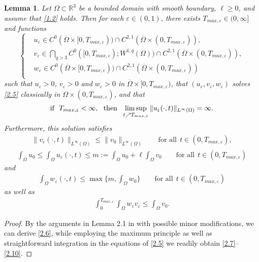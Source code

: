 \documentclass[12pt]{article}
\theoremstyle{plain}
\newtheorem{lemma}{Lemma}[section]
\theoremstyle{definition}
\numberwithin{equation}{section}
\begin{document}
\begin{lemma}\label{lemma2.1}
Let $\Omega \subset \mathbb R^3$ be a bounded domain with smooth boundary, $\ell\geq 0$, and assume that \eqref{1.2} holds.  Then for each $\varepsilon\in(0,1)$, there exists
$T_{max,\varepsilon}\in(0,\infty]$ and functions
\begin{equation*}
\left\{
\begin{aligned}
&u_{\varepsilon }\in C^0(\overline{\Omega}\times [0,T_{max,\varepsilon}))\cap C^{2,1}(\overline{\Omega}\times(0,T_{max,\varepsilon})), \\
&v_{\varepsilon }\in  \textstyle\bigcap_{q>3} C^0([0,T_{max,\varepsilon});W^{1,q}(\Omega))\cap C^{2,1}(\overline{\Omega}\times(0,T_{max,\varepsilon})),\\
&w_{\varepsilon }\in  C^0(\overline{\Omega}\times[0,T_{max,\varepsilon}))\cap C^{2,1}(\overline{\Omega}\times(0,T_{max,\varepsilon})) \\
\end{aligned}
\right.
\end{equation*}
such that $u_ \varepsilon >0$, $v_ \varepsilon >0$ and $w_{\varepsilon}>0$ in $\overline{\Omega} \times [0,T_{max,\varepsilon})$, that $(u_{\varepsilon
},v_{\varepsilon },w_{\varepsilon })$ solves \eqref{2.5} classically in $\Omega\times(0,T_{max,\varepsilon})$, and that
  \begin{equation} \label{2.6}
   \hbox{if}~~  T_{max,\varepsilon}<\infty, ~~ \mbox{then}~~
   \limsup_{t\nearrow T_{max,\varepsilon}}\|u_\varepsilon(\cdot , t)\|_{L^{\infty}(\Omega)}=\infty.
\end{equation}
Furthermore, this solution satisfies
\begin{align}\label{2.7}
    \|v_{\varepsilon}(\cdot , t)\|_{L^{\infty}(\Omega)}\leq \|v_{0 }\|_{L^{\infty}(\Omega)}\qquad \mbox{for all}~~ t\in(0,T_{max,\varepsilon}),
\end{align}
\begin{align}\label{2.8}
    \int_{\Omega}u_{0}\leq \int_{\Omega}u_{\varepsilon}(\cdot,t)\leq m:=\int_\Omega u_0+\ell\int_\Omega v_0\qquad \mbox{for
    all}~~ t\in(0,T_{max,\varepsilon})
\end{align}
and
\begin{align}\label{2.9}
    \int_{\Omega}w_{\varepsilon}(\cdot,t)\leq\max\bigg\{m,\int_\Omega w_0\bigg\}\qquad \mbox{for
    all}~~ t\in(0,T_{max,\varepsilon})
\end{align}
as well as
\begin{align}\label{2.10}
    \int_{0}^{T_{max,\varepsilon}}\int_{\Omega}w_{\varepsilon }v_{\varepsilon }\leq \int_{\Omega}v_{0}.
\end{align}
\end{lemma}
\begin{proof}
By the arguments in Lemma 2.1 in \cite{WNARWA} with possible minor modifications, we can derive \eqref{2.6}, while employing the maximum principle as well as straightforward integration in the equations of \eqref{2.5} we readily obtain \eqref{2.7}--\eqref{2.10}.
\end{proof}
\end{document}
